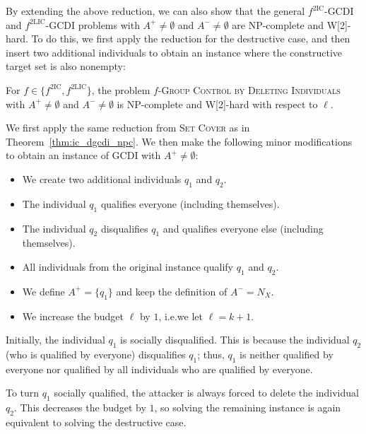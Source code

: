 \documentclass[
    12pt,               %
    a4paper,            %
    bibtotoc,           %
    pointlessnumbers,   %
    ngerman,            %
    titlepage,          %
    leqno,              %
    ]{scrarticle}       %
\newcommand\thmref{Theorem~\ref}
\begin{document}
By extending the above reduction, we can also show that the general $f^{\text{2IC}}$-GCDI and $f^{\text{2LIC}}$-GCDI problems with $A^+ \neq \emptyset$ and $A^- \neq \emptyset$ are NP-complete and W[2]-hard. To do this, we first apply the reduction for the destructive case, and then insert two additional individuals to obtain an instance where the constructive target set is also nonempty:

\begin{Corollary} \label{cor:2ic_gcdi_npc}
For $f \in \{ f^{\text{2IC}}, f^{\text{2LIC}} \}$, the problem $f$-\textsc{Group Control by Deleting Individuals} with $A^+ \neq \emptyset$ and $A^- \neq \emptyset$ is NP-complete and W[2]-hard with respect to $\ell$.
\end{Corollary}

\begin{Proof}
We first apply the same reduction from \textsc{Set Cover} as in \thmref{thm:ic_dgcdi_npc}. We then make the following minor modifications to obtain an instance of GCDI with $A^+ \neq \emptyset$:

\begin{itemize}[nolistsep]
\item
We create two additional individuals $q_1$ and $q_2$.
\item
The individual $q_1$ qualifies everyone (including themselves).
\item
The individual $q_2$ disqualifies $q_1$ and qualifies everyone else (including themselves).
\item
All individuals from the original instance qualify $q_1$ and $q_2$.
\item
We define $A^+ = \{q_1\}$ and keep the definition of $A^- = N_X$.
\item
We increase the budget $\ell$ by $1$, i.e.\@ we let $\ell = k+1$.
\end{itemize}

Initially, the individual $q_1$ is socially disqualified. This is because the individual $q_2$ (who is qualified by everyone) disqualifies $q_1$; thus, $q_1$ is neither qualified by everyone nor qualified by all individuals who are qualified by everyone.

To turn $q_1$ socially qualified, the attacker is always forced to delete the individual $q_2$. This decreases the budget by $1$, so solving the remaining instance is again equivalent to solving the destructive case.
\end{Proof}
\end{document}
